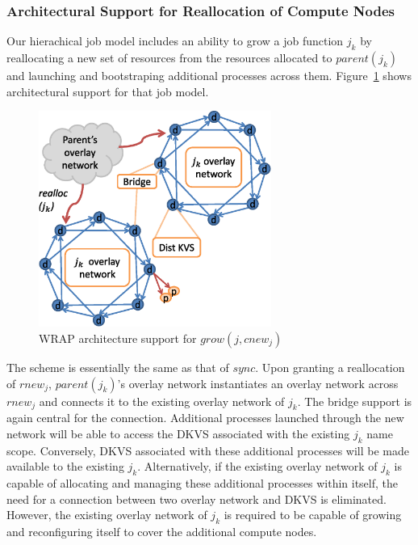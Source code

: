 \subsubsection{Architectural Support for Reallocation of Compute Nodes}
Our hierachical job model includes an ability to grow a job function $j_k$
by reallocating a new set of resources from the resources allocated
to $parent(j_k)$ and launching and bootstraping additional processes
across them.
Figure~\ref{fig:ext2} shows architectural support for that
job model.
\begin{figure}
  \centering
    \includegraphics[width=3.0in]{../fig/WRAP_grow.ps}
  \caption{WRAP architecture support for ${grow(j, cnew_j)}$}
  \label{fig:ext2}
\end{figure}
The scheme is essentially the same as that of $sync$.
Upon granting a reallocation of $rnew_j$,
$parent(j_k)$'s overlay network instantiates an overlay network
across $rnew_j$ and connects it to the existing overlay network
of $j_k$. The bridge support is again central for the connection.
Additional processes launched through the new network will
be able to access the DKVS associated with the existing $j_k$
name scope. Conversely, DKVS associated with these additional
processes will be made available to the existing $j_k$.
Alternatively, if the existing overlay network of $j_k$ is
capable of allocating and managing these additional processes
within itself, the need for a connection between two overlay
network and DKVS is eliminated. However, the existing overlay network
of $j_k$ is required to be capable of growing and
reconfiguring itself to cover the additional compute nodes.

